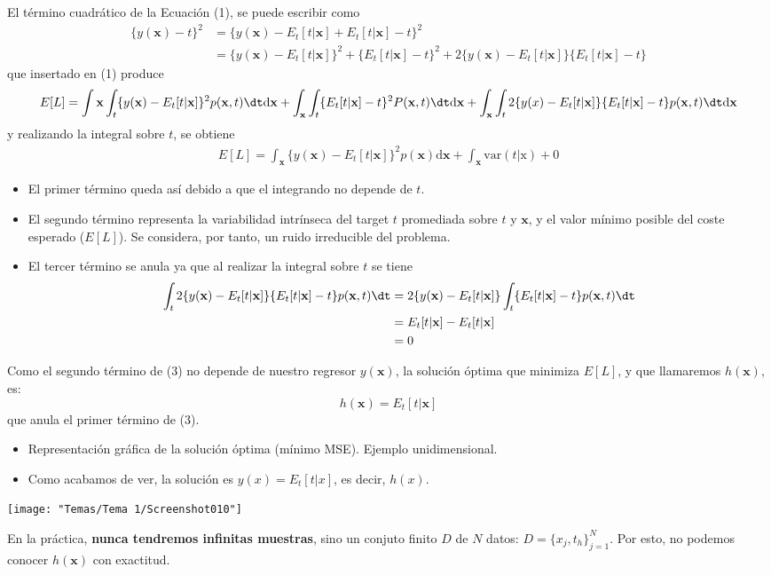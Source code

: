 El término cuadrático de la Ecuación (1), se puede escribir como \[\begin{aligned}
\{y(\mathbf{x})-t\}^2&=\{y(\mathbf{x})-E_t[t|\mathbf{x}]+E_t[t|\mathbf{x}]-t\}^2\\
&=\{y(\mathbf{x})-E_t[t|\mathbf{x}]\}^2+\{E_t[t|\mathbf{x}]-t\}^2+2\{y(\mathbf{x})-E_t[t|\mathbf{x}]\}\{E_t[t|\mathbf{x}]-t\}
\end{aligned}\] que insertado en (1) produce \[
E[L]=\int\mathbf{x}\int_t\{y(\mathbf{x})-E_t[t|\mathbf{x}]\}^2p(\mathbf{x},t)\dt\mathrm{d}\mathbf{x}+\int_\mathbf{x}\int_t\{E_t[t|\mathbf{x}]-t\}^2P(\mathbf{x},t)\dt\mathrm{d}\mathbf{x}+\int_\mathbf{x}\int_t2\{y(x)-E_t[t|\mathbf{x}]\}\{E_t[t|\mathbf{x}]-t\}p(\mathbf{x},t)\dt\mathrm{d}\mathbf{x}
\] y realizando la integral sobre $t$, se obtiene  \begin{align}
	E[L]=\int_{\mathbf{x}}\{y(\mathbf{x})-E_t[t|\mathbf{x}]\}^2p(\mathbf{x})\mathrm{d}\mathbf{x}+\int_\mathbf{x}\mathrm{var}(t|\mathrm{x})+0 
\end{align}
\begin{itemize}
	\item El primer término queda así debido a que el integrando no depende de $t$.
	\item El segundo término representa la variabilidad intrínseca del target $t$ promediada sobre $t$ y $\mathbf{x}$, y el valor mínimo posible del coste esperado ($E[L]$). Se considera, por tanto, un ruido irreducible del problema.
	\item El tercer término se anula ya que al realizar la integral sobre $t$ se tiene \begin{align*}
		\int_t2\{y(\mathbf{x})-E_t[t|\mathbf{x}]\}\{E_t[t|\mathbf{x}]-t\}p(\mathbf{x},t)\dt&=2\{y(\mathbf{x})-E_t[t|\mathbf{x}]\}\int_t\{E_t[t|\mathbf{x}]-t\}p(\mathbf{x},t)\dt\\
		&=E_t[t|\mathbf{x}]-E_t[t|\mathbf{x}]\\
		&=0
	\end{align*}
\end{itemize}
Como el segundo término de (3) no depende de nuestro regresor $y(\mathbf{x})$, la solución óptima que minimiza $E[L]$, y que llamaremos $h(\mathbf{x})$, es: \[ \boxed{h(\mathbf{x})=E_t[t|\mathbf{x}]} \]que anula el primer término de (3).
\begin{itemize}[label=$-$]
	\item Representación gráfica de la solución óptima (mínimo MSE). Ejemplo unidimensional.
	\item Como acabamos de ver, la solución es $y(x)=E_t[t|x]$, es decir, $h(x)$.
\end{itemize}
\begin{center}
	\texttt{[image: "Temas/Tema 1/Screenshot010"]}
\end{center}
En la práctica, \textbf{nunca tendremos infinitas muestras}, sino un conjuto finito $D$ de $N$ datos: $D=\{x_j,t_h\}_{j=1}^{N}$. Por esto, no podemos conocer $h(\mathbf{x})$ con exactitud.

